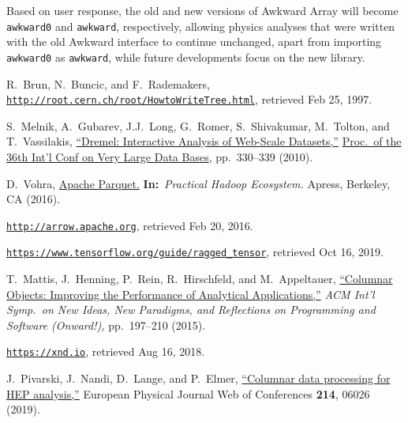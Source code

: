 \documentclass{webofc}
\begin{document}
Based on user response, the old and new versions of Awkward Array will become \texttt{awkward0} and \texttt{awkward}, respectively, allowing physics analyses that were written with the old Awkward interface to continue unchanged, apart from importing \texttt{awkward0} as \texttt{awkward}, while future developments focus on the new library.

\begin{thebibliography}{}

R.\ Brun, N.\ Buncic, and F.\ Rademakers, \\ \href{https://web.archive.org/web/19970225083621/http://root.cern.ch/root/HowtoWriteTree.html}{\tt http://root.cern.ch/root/HowtoWriteTree.html}, retrieved Feb 25, 1997.

S.\ Melnik, A.\ Gubarev, J.J.\ Long, G.\ Romer, S.\ Shivakumar, M.\ Tolton, and T.\ Vassilakis, \href{https://ai.google/research/pubs/pub36632}{``Dremel: Interactive Analysis of Web-Scale Datasets,''} \href{http://www.vldb2010.org/accept.htm}{Proc.\ of the 36th Int'l Conf on Very Large Data Bases}, pp.\ 330--339 (2010).

D.\ Vohra, \href{https://doi.org/10.1007/978-1-4842-2199-0_8}{Apache Parquet.} {\bf In:}\ {\it Practical Hadoop Ecosystem.} Apress, Berkeley, CA (2016).

\href{https://web.archive.org/web/20160220113406/http://arrow.apache.org/}{\tt http://arrow.apache.org}, retrieved Feb 20, 2016.

\href{https://web.archive.org/web/20191016194209/https://www.tensorflow.org/guide/ragged_tensor}{\tt https://www.tensorflow.org/guide/ragged\_tensor}, retrieved Oct 16, 2019.

T.\ Mattis, J.\ Henning, P.\ Rein, R.\ Hirschfeld, and M.\ Appeltauer, \href{https://dl.acm.org/citation.cfm?id=2814228.2814230}{``Columnar Objects: Improving the Performance of Analytical Applications,''} {\it ACM Int'l Symp.\ on New Ideas, New Paradigms, and Reflections on Programming and Software (Onward!),} pp.\ 197--210 (2015).

\href{https://web.archive.org/web/20180816220247/https://xnd.io/}{\tt https://xnd.io}, retrieved Aug 16, 2018.

J.\ Pivarski, J.\ Nandi, D.\ Lange, and P.\ Elmer, \href{https://doi.org/10.1051/epjconf/201921406026}{``Columnar data processing for HEP analysis,''} European Physical Journal Web of Conferences \textbf{214}, 06026 (2019).


\end{thebibliography}
\end{document}
